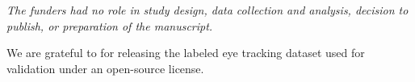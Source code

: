 \textit{The funders had no role in study design, data collection and analysis,
decision to publish, or preparation of the manuscript.}

\begin{acknowledgements}
We are grateful to \cite{Andersson2017} for releasing the labeled
eye tracking dataset used for validation under an open-source license.
\end{acknowledgements}












\clearpage
\listoftodos


